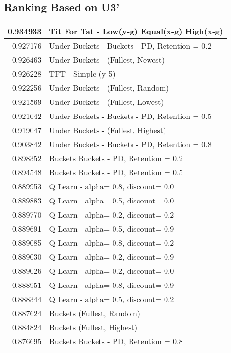 \begin{table}[!hbtp]
\subsection{Ranking Based on U3'}
\begin{footnotesize}
\begin{tabular}{|r|l|}\hline  \label{U3results}
0.934933 & Tit For Tat - Low(y-g) Equal(x-g) High(x-g)\\ \hline
0.927176 & Under Buckets - Buckets - PD, Retention = 0.2\\ \hline
0.926463 & Under Buckets - (Fullest, Newest)\\ \hline
0.926228 & TFT - Simple (y-5)\\ \hline
0.922256 & Under Buckets - (Fullest, Random)\\ \hline
0.921569 & Under Buckets - (Fullest, Lowest)\\ \hline
0.921042 & Under Buckets - Buckets - PD, Retention = 0.5\\ \hline
0.919047 & Under Buckets - (Fullest, Highest)\\ \hline
0.903842 & Under Buckets - Buckets - PD, Retention = 0.8\\ \hline
0.898352 & Buckets Buckets - PD, Retention = 0.2\\ \hline
0.894548 & Buckets Buckets - PD, Retention = 0.5\\ \hline
0.889953 & Q Learn - alpha= 0.8, discount= 0.0\\ \hline
0.889883 & Q Learn - alpha= 0.5, discount= 0.0\\ \hline
0.889770 & Q Learn - alpha= 0.2, discount= 0.2\\ \hline
0.889691 & Q Learn - alpha= 0.5, discount= 0.9\\ \hline
0.889085 & Q Learn - alpha= 0.8, discount= 0.2\\ \hline
0.889030 & Q Learn - alpha= 0.2, discount= 0.9\\ \hline
0.889026 & Q Learn - alpha= 0.2, discount= 0.0\\ \hline
0.888951 & Q Learn - alpha= 0.8, discount= 0.9\\ \hline
0.888344 & Q Learn - alpha= 0.5, discount= 0.2\\ \hline
0.887624 & Buckets (Fullest, Random)\\ \hline
0.884824 & Buckets (Fullest, Highest)\\ \hline
0.876695 & Buckets Buckets - PD, Retention = 0.8\\ \hline

\end{tabular}
\end{footnotesize}
\end{table}
